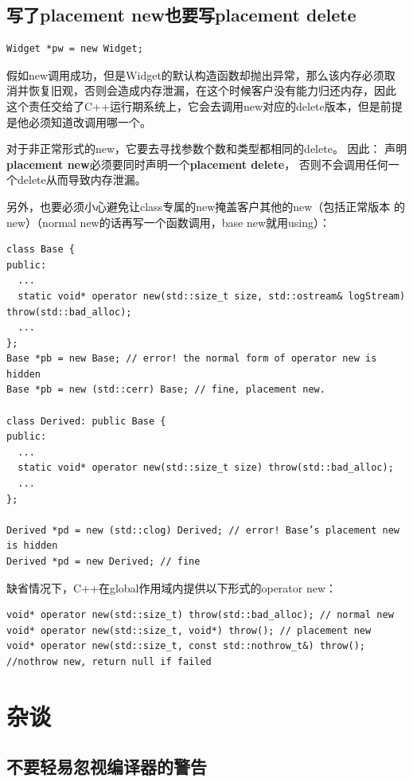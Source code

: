 \documentclass[a4paper,twoside]{article}
\theoremstyle{definition}
\theoremstyle{remark}
\numberwithin{equation}{section}
\begin{document}
\subsection{写了placement new也要写placement delete}
\label{sec:Item-52}

\begin{verbatim}
Widget *pw = new Widget;
\end{verbatim}
假如new调用成功，但是Widget的默认构造函数却抛出异常，那么该内存必须取
消并恢复旧观，否则会造成内存泄漏，在这个时候客户没有能力归还内存，因此
这个责任交给了C++运行期系统上，它会去调用new对应的delete版本，但是前提
是他必须知道改调用哪一个。

对于非正常形式的new，它要去寻找参数个数和类型都相同的delete。 因此：
声明\textbf{placement new}必须要同时声明一个\textbf{placement delete}，
否则不会调用任何一个delete从而导致内存泄漏。

另外，也要必须小心避免让class专属的new掩盖客户其他的new（包括正常版本
的new）（normal new的话再写一个函数调用，base new就用using）：
\begin{verbatim}
class Base {
public:
  ...
  static void* operator new(std::size_t size, std::ostream& logStream) throw(std::bad_alloc); 
  ...
};
Base *pb = new Base; // error! the normal form of operator new is hidden
Base *pb = new (std::cerr) Base; // fine, placement new.

class Derived: public Base {
public:
  ...
  static void* operator new(std::size_t size) throw(std::bad_alloc);
  ...
};

Derived *pd = new (std::clog) Derived; // error! Base’s placement new is hidden
Derived *pd = new Derived; // fine
\end{verbatim}

缺省情况下，C++在global作用域内提供以下形式的operator new：
\begin{verbatim}
void* operator new(std::size_t) throw(std::bad_alloc); // normal new
void* operator new(std::size_t, void*) throw(); // placement new
void* operator new(std::size_t, const std::nothrow_t&) throw(); //nothrow new, return null if failed 
\end{verbatim}

\section{杂谈}

\subsection{不要轻易忽视编译器的警告}
\label{sec:Item-53}




\end{document}
